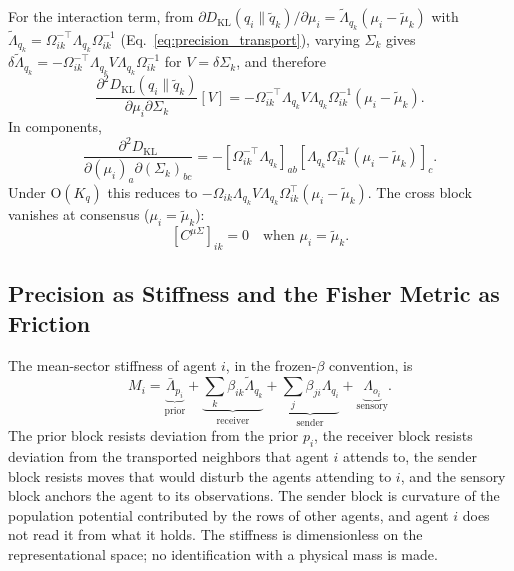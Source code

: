 For the interaction term, from $\partial D_{\mathrm{KL}}(q_i \| \tilde{q}_k)/\partial \mu_i = \tilde{\Lambda}_{q_k}(\mu_i - \tilde{\mu}_k)$ with $\tilde{\Lambda}_{q_k} = \Omega_{ik}^{-\top}\Lambda_{q_k}\Omega_{ik}^{-1}$ (Eq.~\eqref{eq:precision_transport}), varying $\Sigma_k$ gives $\delta\tilde{\Lambda}_{q_k} = -\Omega_{ik}^{-\top}\Lambda_{q_k} V \Lambda_{q_k}\Omega_{ik}^{-1}$ for $V = \delta\Sigma_k$, and therefore
\begin{equation}
\frac{\partial^2 D_{\mathrm{KL}}(q_i \| \tilde{q}_k)}{\partial \mu_i \partial \Sigma_k}[V] = -\Omega_{ik}^{-\top}\Lambda_{q_k} V \Lambda_{q_k} \Omega_{ik}^{-1} (\mu_i - \tilde{\mu}_k).
\end{equation}
In components,
\begin{equation}
\frac{\partial^2 D_{\mathrm{KL}}}{\partial(\mu_i)_a \partial(\Sigma_k)_{bc}} = -[\Omega_{ik}^{-\top}\Lambda_{q_k}]_{ab}[\Lambda_{q_k}\Omega_{ik}^{-1}(\mu_i - \tilde{\mu}_k)]_c.
\end{equation}
Under $\mathrm{O}(K_q)$ this reduces to $-\Omega_{ik}\Lambda_{q_k} V \Lambda_{q_k}\Omega_{ik}^\top(\mu_i - \tilde{\mu}_k)$. The cross block vanishes at consensus ($\mu_i = \tilde{\mu}_k$):
\begin{equation}
\boxed{[C^{\mu\Sigma}]_{ik} = 0 \quad \text{when } \mu_i = \tilde{\mu}_k.}
\label{eq:cross_block}
\end{equation}

\subsection{Precision as Stiffness and the Fisher Metric as Friction}
\label{sec:stiffness_friction}

The mean-sector stiffness of agent $i$, in the frozen-$\beta$ convention, is
\begin{equation}
M_i = \underbrace{\bar{\Lambda}_{p_i}}_{\text{prior}} + \underbrace{\sum_k \beta_{ik}\tilde{\Lambda}_{q_k}}_{\text{receiver}} + \underbrace{\sum_j \beta_{ji}\Lambda_{q_i}}_{\text{sender}} + \underbrace{\Lambda_{o_i}}_{\text{sensory}}.
\label{eq:effective_mass}
\end{equation}
The prior block resists deviation from the prior $p_i$, the receiver block resists deviation from the transported neighbors that agent $i$ attends to, the sender block resists moves that would disturb the agents attending to $i$, and the sensory block anchors the agent to its observations. The sender block is curvature of the population potential contributed by the rows of other agents, and agent $i$ does not read it from what it holds. The stiffness is dimensionless on the representational space; no identification with a physical mass is made.

